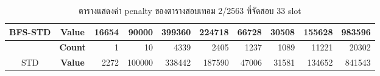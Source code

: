 \begin{table}[]
{\begin{tabular}{@{}ccrrrrrrrr@{}}
    \multirow{-2}{*}{BFS-STD}                    & \textbf{Value}                        & 16654                          & 90000                          & 399360                         & 224718                         & 66728                          & 30508                          & 155628                         & 983596                           \\ \midrule
                                                  & {\textbf{Count}} & {1}       & {10}      & {4339}    & {2405}    & {1237}    & {1089}    & {11221}   & {20302}     \\ \cmidrule(l){2-10} 
    \multirow{-2}{*}{STD} & {\textbf{Value}} & {2272}    & {100000}  & {338442}  & {187590}  & {47006}   & {31581}   & {134652}  & {841543}    \\ \bottomrule
    \end{tabular}%
    }
    \caption{ตารางแสดงค่า penalty ของตารางสอบเทอม 2/2563 ที่จัดสอบ 33 slot}
    \label{tab:result_table_263_33}
\end{table}
